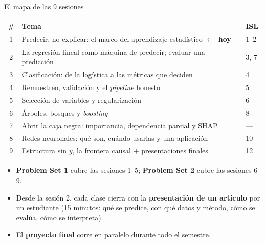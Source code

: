\documentclass{beamer}
\newcommand{\1}{\mathbb{I}}
\begin{document}
\begin{frame}{El mapa de las 9 sesiones}
\begin{center}
\footnotesize
\begin{tabular}{cll}
\hline
\# & Tema & ISL \\
\hline
1 & Predecir, no explicar: el marco del aprendizaje estadístico \quad $\leftarrow$ \textbf{hoy} & 1--2 \\
2 & La regresión lineal como máquina de predecir; evaluar una predicción & 3, 7 \\
3 & Clasificación: de la logística a las métricas que deciden & 4 \\
4 & Remuestreo, validación y el \emph{pipeline} honesto & 5 \\
5 & Selección de variables y regularización & 6 \\
6 & Árboles, bosques y \emph{boosting} & 8 \\
7 & Abrir la caja negra: importancia, dependencia parcial y SHAP & --- \\
8 & Redes neuronales: qué son, cuándo usarlas y una aplicación & 10 \\
9 & Estructura sin $y$, la frontera causal $+$ presentaciones finales & 12 \\
\hline
\end{tabular}
\end{center}

\vspace{0.25cm}
\small
\begin{itemize}\itemsep3pt
  \item \textbf{Problem Set 1} cubre las sesiones 1--5; \textbf{Problem Set 2} cubre las sesiones 6--9.
  \item Desde la sesión 2, cada clase cierra con la \textbf{presentación de un artículo} por un estudiante (15 minutos: qué se predice, con qué datos y método, cómo se evalúa, cómo se interpreta).
  \item El \textbf{proyecto final} corre en paralelo durante todo el semestre.
\end{itemize}
\end{frame}
\end{document}
